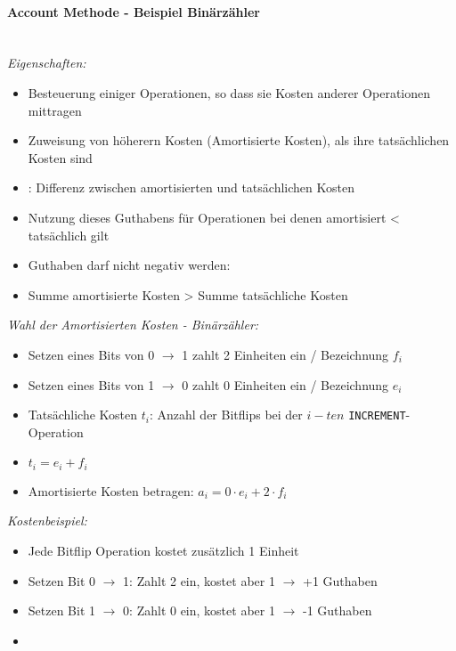 \documentclass[
    ngerman,
    color=3b,
    summary,
    boxarc,
]{rubos-tuda-template}
\begin{document}
\paragraph{Account Methode - Beispiel Binärzähler}\mbox{}\vspace{1em}\\
\textit{Eigenschaften:}
          \begin{itemize}
              \item Besteuerung einiger Operationen, so dass sie Kosten anderer Operationen mittragen
              \item Zuweisung von höherern Kosten (Amortisierte Kosten), als ihre tatsächlichen Kosten sind
              \item {}: Differenz zwischen amortisierten und tatsächlichen Kosten
              \item Nutzung dieses Guthabens für Operationen bei denen amortisiert < tatsächlich gilt
              \item Guthaben darf nicht negativ werden:
              \item[] Summe amortisierte Kosten > Summe tatsächliche Kosten
          \end{itemize}

\textit{Wahl der Amortisierten Kosten - Binärzähler:}
          \begin{itemize}
              \item Setzen eines Bits von 0 $\rightarrow$ 1 zahlt 2 Einheiten ein / Bezeichnung $f_i$
              \item Setzen eines Bits von 1 $\rightarrow$ 0 zahlt 0 Einheiten ein / Bezeichnung $e_i$
              \item Tatsächliche Kosten $t_i$: Anzahl der Bitflips bei der $i-ten$ \texttt{INCREMENT}-Operation
              \item[] $t_i = e_i + f_i$
              \item Amortisierte Kosten betragen: $a_i = 0 \cdot e_i + 2 \cdot f_i$
          \end{itemize}

\textit{Kostenbeispiel:}
          \begin{itemize}
              \item Jede Bitflip Operation kostet zusätzlich 1 Einheit
              \item Setzen Bit 0 $\rightarrow$ 1: Zahlt 2 ein, kostet aber 1 $\rightarrow$ +1 Guthaben
              \item Setzen Bit 1 $\rightarrow$ 0: Zahlt 0 ein, kostet aber 1 $\rightarrow$ -1 Guthaben
              \item[]
          \end{itemize}
\end{document}
